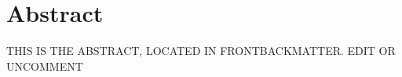 

\begingroup
\let\clearpage\relax
\let\cleardoublepage\relax
\let\cleardoublepage\relax

\chapter*{Abstract} %

\label{ch:introduction} %

THIS IS THE ABSTRACT, LOCATED IN FRONTBACKMATTER. EDIT OR UNCOMMENT

\endgroup			

\vfill